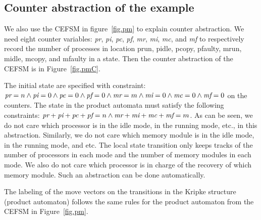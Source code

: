 \subsection*{Counter abstraction of the example} 
We also use the CEFSM in figure~\ref{fig.pm} to explain counter abstraction. 
We need eight counter variables: 
{\em pr}, 
{\em pi}, 
{\em pc}, 
{\em pf}, 
{\em mr}, 
{\em mi}, 
{\em mc}, and 
{\em mf} to respectively record the 
number of processes in location prun, pidle, pcopy, pfaulty, mrun, midle, mcopy, and mfaulty
in a state.  
Then the counter abstraction of the CEFSM is in Figure~\ref{fig.pmC}.  
\begin{figure*}[t] 
\begin{center} 
\caption{Counter abstraction of the CEFSM templates of $n$ processors and $m$ memory copies}
\label{fig.pmC}
\end{center} 
\end{figure*}
The initial state are specified with constraint: 
$\mbox{\em pr}=n
\wedge \mbox{\em pi}=0
\wedge \mbox{\em pc}=0
\wedge \mbox{\em pf}=0
\wedge \mbox{\em mr}=m
\wedge \mbox{\em mi}=0
\wedge \mbox{\em mc}=0
\wedge \mbox{\em mf}=0$
on the counters.  
The state in the product automata must satisfy the following constraints: 
$\mbox{\em pr}+\mbox{\em pi}+\mbox{\em pc}+\mbox{\em pf}=n
\wedge \mbox{\em mr}+\mbox{\em mi}+\mbox{\em mc}+\mbox{\em mf}=m$.  
As can be seen, we do not care which processor is in the idle mode, 
in the running mode, etc., in this abstraction. 
Similarly, we do not care which memory module is in the idle mode, in the running mode, and etc. 
The local state transition only keeps tracks of the number of processors in each mode and 
the number of memory modules in each mode. 
We also do not care which processor is in charge of the recovery of which memory module.  
Such an abstraction can be done automatically.  

The labeling of the move vectors on the transitions in the Kripke structure (product automaton)
follows the same rules for the product automaton from the CEFSM in Figure~\ref{fig.pm}.  




